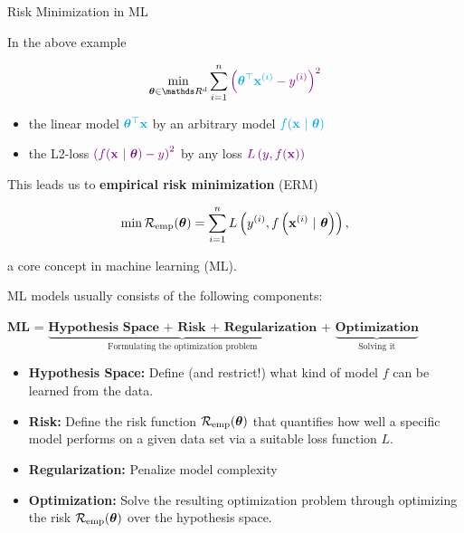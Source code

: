 \documentclass[11pt,compress,t,notes=noshow, xcolor=table]{beamer}
\begin{document}
\begin{vbframe}{Risk Minimization in ML}
	
In the above example

$$
\min_{\thetab \in \R^d} \sum_{i = 1}^n \textcolor{violet}{\left(\textcolor{cyan}{\thetab^\top \xi} - \yi\right)^2}
$$

\begin{itemize}
	\item the linear model $\textcolor{cyan}{\bm{\theta}^\top \mathbf{x}}$ by an arbitrary model $\textcolor{cyan}{f(\mathbf{x} ~|~ \bm{\theta})}$ %
	\item the L2-loss $\textcolor{violet}{\left(f(\mathbf{x} ~|~ \bm{\theta}) - y\right)^2}$ by any loss $\textcolor{violet}{L\left(y, f(\mathbf{x})\right)}$
\end{itemize}

\lz 

This leads us to \textbf{empirical risk minimization} (ERM)

	$$
	\min \mathcal{R}_{\text{emp}}(\bm{\theta}) =  \sum\limits_{i=1}^n L\left(y^{(i)}, f\left(\mathbf{x}^{(i)} ~|~ \bm{\theta}\right)\right),
	$$

a core concept in machine learning (ML). 

\framebreak 

ML models usually consists of the following components: 

\begin{center}

  \textbf{ML} = $\underbrace{\textbf{Hypothesis Space + Risk + Regularization}}_{\text{Formulating the optimization problem}}$ + $\underbrace{\textbf{Optimization}}_{\text{Solving it}}$ 
  
\end{center}

\lz

\begin{itemize}

  \item \textbf{Hypothesis Space:} Define (and restrict!) what kind of model 
  $f$ can be learned from the data.
  
  \item \textbf{Risk:} Define the risk function $\mathcal{R}_{\text{emp}}(\bm{\theta})$ that quantifies how well a specific model performs on a given 
  data set via a suitable loss function $L$.
  
  \item \textbf{Regularization:} Penalize model complexity 

  \item \textbf{Optimization:} Solve the resulting optimization problem through optimizing the risk $\mathcal{R}_{\text{emp}}(\bm{\theta})$ over the hypothesis space.

  
\end{itemize}

\end{vbframe}
\end{document}
